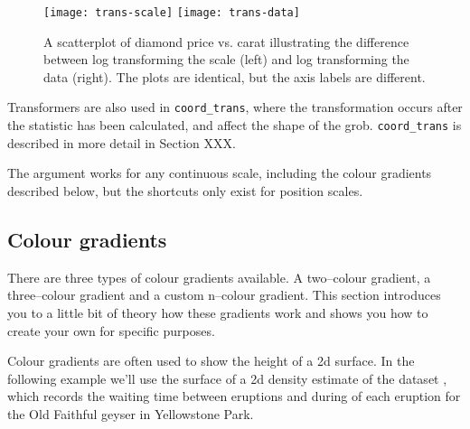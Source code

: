 \begin{figure}[htbp]
  \centering
    \texttt{[image: trans-scale]}%
    \texttt{[image: trans-data]}
  \caption{A scatterplot of diamond price vs. carat illustrating the difference between log transforming the scale (left) and log transforming the data (right).  The plots are identical, but the axis labels are different.}
  \label{fig:trans}
\end{figure}



Transformers are also used in \verb|coord_trans|, where the transformation occurs after the statistic has been calculated, and affect the shape of the grob.  \verb|coord_trans| is described in more detail in Section XXX.

The  argument works for any continuous scale, including the colour gradients described below, but the shortcuts only exist for position scales.

\subsection{Colour gradients}
\label{sub:scale-gradient}

There are three types of colour gradients available.  A two--colour gradient, a three--colour gradient and a custom n--colour gradient.  This section introduces you to a little bit of theory how these gradients work and shows you how to create your own for specific purposes.



Colour gradients are often used to show the height of a 2d surface.  In the following example we'll use the surface of a 2d density estimate of the  dataset \citep{azzalini:1990}, which records the waiting time between eruptions and during of each eruption for the Old Faithful geyser in Yellowstone Park.  

